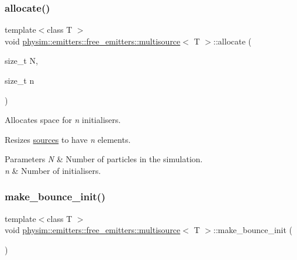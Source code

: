 \subsubsection{\texorpdfstring{allocate()}{allocate()}}
{\footnotesize\ttfamily template$<$class T $>$ \\
void \hyperlink{classphysim_1_1emitters_1_1free__emitters_1_1multisource}{physim\+::emitters\+::free\+\_\+emitters\+::multisource}$<$ T $>$\+::allocate (\begin{DoxyParamCaption}\item[{size\+\_\+t}]{N,  }\item[{size\+\_\+t}]{n }\end{DoxyParamCaption})}



Allocates space for {\itshape n} initialisers. 

Resizes \hyperlink{classphysim_1_1emitters_1_1free__emitters_1_1multisource_af6304e14f12572ab5b768b0d5ec54d35}{sources} to have {\itshape n} elements. 
\begin{DoxyParams}{Parameters}
{\em N} & Number of particles in the simulation. \\
\hline
{\em n} & Number of initialisers. \\
\hline
\end{DoxyParams}
\mbox{\label{classphysim_1_1emitters_1_1free__emitters_1_1multisource_a0f49d5a98f7ab5be200ec471ed71258e}} 
\subsubsection{\texorpdfstring{make\+\_\+bounce\+\_\+init()}{make\_bounce\_init()}}
{\footnotesize\ttfamily template$<$class T $>$ \\
void \hyperlink{classphysim_1_1emitters_1_1free__emitters_1_1multisource}{physim\+::emitters\+::free\+\_\+emitters\+::multisource}$<$ T $>$\+::make\+\_\+bounce\+\_\+init (\begin{DoxyParamCaption}{ }\end{DoxyParamCaption})}



